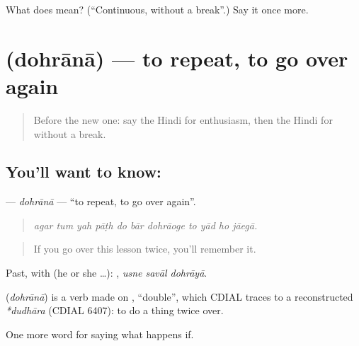 \begin{tcolorbox}[breakable,colback=teal!4,colframe=teal!35!black,title={Before you move on}]
What does  mean? (\textquotedblleft{}Continuous, without a break\textquotedblright{}.) Say it once more.
\end{tcolorbox}
\section[\texorpdfstring{\hi{दोहराना} (dohrānā)}{दोहराना (dohrānā)}]{ (dohrānā) — to repeat, to go over again}

\label{lesson:HI-C391-dohrana}



\begin{quote}
Before the new one: say the Hindi for enthusiasm, then the Hindi for without a break.
\end{quote}

\subsection*{You'll want to know: }
\textbf{} — \emph{dohrānā} — \textquotedblleft{}to repeat, to go over again\textquotedblright{}.

\begin{quote}
          
\end{quote}

\begin{quote}
\emph{agar tum yah pāṭh do bār dohrāoge to yād ho jāegā.}
\end{quote}

\begin{quote}
If you go over this lesson twice, you'll remember it.
\end{quote}

Past, with  (he or she …):   , \emph{usne savāl dohrāyā}.

\begin{cousinweb}
\textbf{} (\emph{dohrānā}) is a verb made on , \textquotedblleft{}double\textquotedblright{}, which CDIAL traces to a reconstructed \emph{*dudhāra} (CDIAL 6407): to do a thing twice over.
\end{cousinweb}

\begin{grammarlens}[title={What you've built}]
One more word for saying what happens if.
\end{grammarlens}

